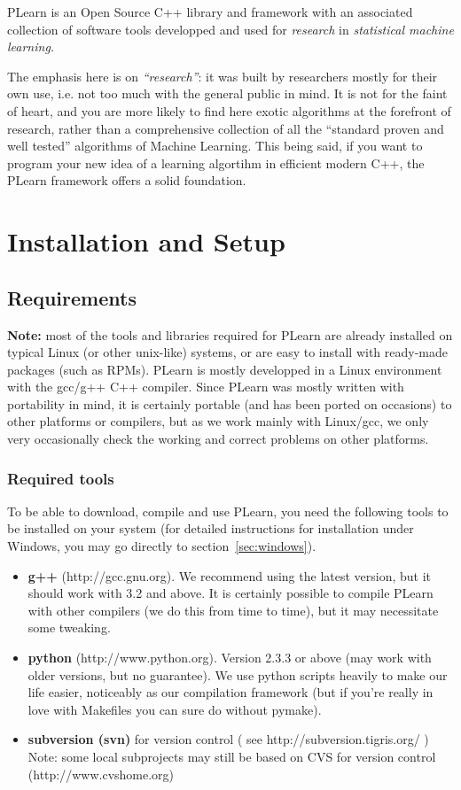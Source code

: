 \documentclass[11pt]{book}
\begin{document}
PLearn is an Open Source C++ library and framework with an associated
collection of software tools developped and used for \emph{research} in
\emph{statistical machine learning.} 

The emphasis here is on \emph{``research''}: it was built by researchers
mostly for their own use, i.e. not too much with the general public in
mind. It is not for the faint of heart, and you are more likely to
find here exotic algorithms at the forefront of research, rather than a
comprehensive collection of all the ``standard proven and well tested''
algorithms of Machine Learning. This being said, if you want to program
your new idea of a learning algortihm in efficient modern C++, the PLearn
framework offers a solid foundation.

\chapter{Installation and Setup}
\label{chap:label}

\section{Requirements}

{\bf Note:} most of the tools and libraries required for PLearn are already
installed on typical Linux (or other unix-like) systems, or are easy to
install with ready-made packages (such as RPMs). PLearn is mostly
developped in a Linux environment with the gcc/g++ C++ compiler.  Since
PLearn was mostly written with portability in mind, it is certainly
portable (and has been ported on occasions) to other platforms or
compilers, but as we work mainly with Linux/gcc, we only very occasionally
check the working and correct problems on other platforms.


\subsection{Required tools}

To be able to download, compile and use PLearn, you need the following
tools to be installed on your system (for detailed instructions for
installation under Windows,
you may go directly to section~\ref{sec:windows}).
\begin{itemize}
\item {\bf g++} (http://gcc.gnu.org). We recommend using the latest version,
  but it should work with 3.2 and above. It is certainly possible to
  compile PLearn with other compilers (we do this from time to time), but
  it may necessitate some tweaking.
\item {\bf python} (http://www.python.org). Version 2.3.3 or above (may
  work with older versions, but no guarantee). We use python scripts
  heavily to make our life easier, noticeably as our compilation framework
  (but if you're really in love with Makefiles you can sure do without
  pymake).
\item {\bf subversion (svn)} for version control ( see http://subversion.tigris.org/ )
Note: some local subprojects may still be based on CVS for version control (http://www.cvshome.org)
\end{itemize}
\end{document}
